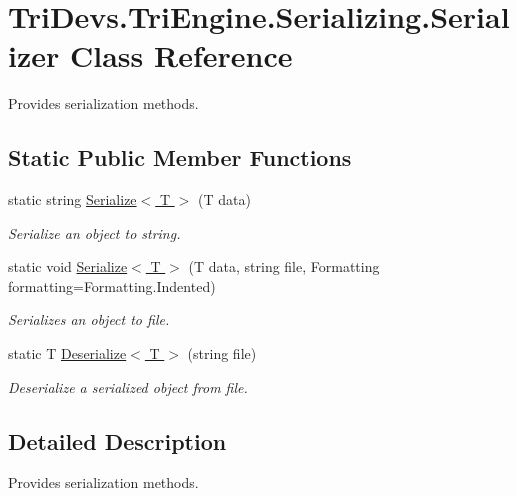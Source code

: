 \hypertarget{class_tri_devs_1_1_tri_engine_1_1_serializing_1_1_serializer}{\section{Tri\-Devs.\-Tri\-Engine.\-Serializing.\-Serializer Class Reference}
\label{class_tri_devs_1_1_tri_engine_1_1_serializing_1_1_serializer}
}


Provides serialization methods.  


\subsection*{Static Public Member Functions}
\begin{DoxyCompactItemize}
\item 
static string \hyperlink{class_tri_devs_1_1_tri_engine_1_1_serializing_1_1_serializer_a826d766f1b6b491a130c9961b48507ab}{Serialize$<$ T $>$} (T data)
\begin{DoxyCompactList}\small\item\em Serialize an object to string. \end{DoxyCompactList}\item 
static void \hyperlink{class_tri_devs_1_1_tri_engine_1_1_serializing_1_1_serializer_adcce64c27d210f272b5c87dbdb54c7d1}{Serialize$<$ T $>$} (T data, string file, Formatting formatting=Formatting.\-Indented)
\begin{DoxyCompactList}\small\item\em Serializes an object to file. \end{DoxyCompactList}\item 
static T \hyperlink{class_tri_devs_1_1_tri_engine_1_1_serializing_1_1_serializer_a004dd46a3f7a1ed31842fd7a9800817a}{Deserialize$<$ T $>$} (string file)
\begin{DoxyCompactList}\small\item\em Deserialize a serialized object from file. \end{DoxyCompactList}\end{DoxyCompactItemize}


\subsection{Detailed Description}
Provides serialization methods. 



